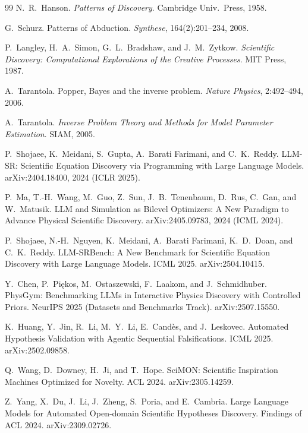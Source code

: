 \documentclass[11pt]{article}
\begin{document}
\begin{thebibliography}{99}
 N.~R.~Hanson.
\newblock \emph{Patterns of Discovery}. Cambridge Univ.\ Press, 1958.

 G.~Schurz.
\newblock Patterns of Abduction. \emph{Synthese}, 164(2):201--234, 2008.

 P.~Langley, H.~A.~Simon, G.~L.~Bradshaw, and J.~M.~Zytkow.
\newblock \emph{Scientific Discovery: Computational Explorations of the Creative Processes}. MIT Press,
1987.

 A.~Tarantola.
\newblock Popper, Bayes and the inverse problem. \emph{Nature Physics}, 2:492--494, 2006.

 A.~Tarantola.
\newblock \emph{Inverse Problem Theory and Methods for Model Parameter Estimation}. SIAM, 2005.

 P.~Shojaee, K.~Meidani, S.~Gupta, A.~Barati Farimani, and C.~K.~Reddy.
\newblock LLM-SR: Scientific Equation Discovery via Programming with Large Language Models.
\newblock arXiv:2404.18400, 2024 (ICLR 2025).

 P.~Ma, T.-H.~Wang, M.~Guo, Z.~Sun, J.~B.~Tenenbaum, D.~Rus, C.~Gan, and W.~Matusik.
\newblock LLM and Simulation as Bilevel Optimizers: A New Paradigm to Advance Physical Scientific
Discovery.
\newblock arXiv:2405.09783, 2024 (ICML 2024).

 P.~Shojaee, N.-H.~Nguyen, K.~Meidani, A.~Barati Farimani, K.~D.~Doan, and
C.~K.~Reddy.
\newblock LLM-SRBench: A New Benchmark for Scientific Equation Discovery with Large Language Models.
\newblock ICML 2025. arXiv:2504.10415.

 Y.~Chen, P.~Pi\k{e}kos, M.~Ostaszewski, F.~Laakom, and J.~Schmidhuber.
\newblock PhysGym: Benchmarking LLMs in Interactive Physics Discovery with Controlled Priors.
\newblock NeurIPS 2025 (Datasets and Benchmarks Track). arXiv:2507.15550.

 K.~Huang, Y.~Jin, R.~Li, M.~Y.~Li, E.~Cand\`es, and J.~Leskovec.
\newblock Automated Hypothesis Validation with Agentic Sequential Falsifications.
\newblock ICML 2025. arXiv:2502.09858.


 Q.~Wang, D.~Downey, H.~Ji, and T.~Hope.
\newblock SciMON: Scientific Inspiration Machines Optimized for Novelty.
\newblock ACL 2024. arXiv:2305.14259.

 Z.~Yang, X.~Du, J.~Li, J.~Zheng, S.~Poria, and E.~Cambria.
\newblock Large Language Models for Automated Open-domain Scientific Hypotheses Discovery.
\newblock Findings of ACL 2024. arXiv:2309.02726.


\end{thebibliography}
\end{document}
